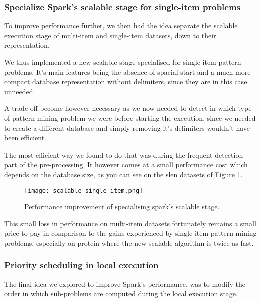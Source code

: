 \documentclass{eplmastersthesis}
\begin{document}
\subsubsection{Specialize Spark's scalable stage for single-item problems}

To improve performance further, we then had the idea separate the scalable execution stage of multi-item and single-item datasets, down to their representation. \newline

We thus implemented a new scalable stage specialised for single-item pattern problems. It's main features being the absence of spacial start and a much more compact database representation without delimiters, since they are in this case unneeded. \newline

A trade-off become however necessary as we now needed to detect in which type of pattern mining problem we were before starting the execution, since we needed to create a different database and simply removing it's delimiters wouldn't have been efficient. \newline

The most efficient way we found to do that was during the frequent detection part of the pre-processing. It however comes at a small performance cost which depends on the database size, as you can see on the slen datasets of Figure \ref{fig:scalable_single_item}. \newline

\begin{figure}[h]
  \centering
  \texttt{[image: scalable\_single\_item.png]}
  \caption{Performance improvement of specialising spark's scalable stage.}
  \label{fig:scalable_single_item}
\end{figure}

This small loss in performance on multi-item datasets fortunately remains a small price to pay in comparison to the gains experienced by single-item pattern mining problems, especially on protein where the new scalable algorithm is twice as fast.

\subsubsection{Priority scheduling in local execution}

The final idea we explored to improve Spark's performance, was to modify the order in which sub-problems are computed during the local execution stage. \newline
\end{document}

